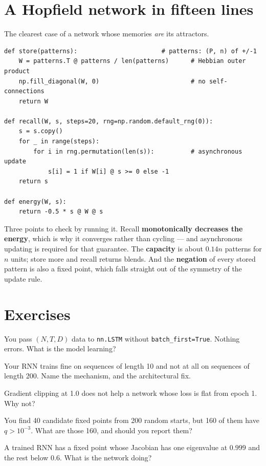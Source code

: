 \documentclass[11pt]{article}
\begin{document}
\section{A Hopfield network in fifteen lines}

The clearest case of a network whose memories \emph{are} its attractors.

\begin{lstlisting}
def store(patterns):                       # patterns: (P, n) of +/-1
    W = patterns.T @ patterns / len(patterns)      # Hebbian outer product
    np.fill_diagonal(W, 0)                         # no self-connections
    return W

def recall(W, s, steps=20, rng=np.random.default_rng(0)):
    s = s.copy()
    for _ in range(steps):
        for i in rng.permutation(len(s)):          # asynchronous update
            s[i] = 1 if W[i] @ s >= 0 else -1
    return s

def energy(W, s):
    return -0.5 * s @ W @ s
\end{lstlisting}

Three points to check by running it. Recall \textbf{monotonically decreases the
energy}, which is why it converges rather than cycling --- and asynchronous
updating is required for that guarantee. The \textbf{capacity} is about
$0.14n$ patterns for $n$ units; store more and recall returns blends. And the
\textbf{negation} of every stored pattern is also a fixed point, which falls
straight out of the symmetry of the update rule.

\section{Exercises}

 You pass $(N, T, D)$ data to \texttt{nn.LSTM} without
\texttt{batch\_first=True}. Nothing errors. What is the model learning?

 Your RNN trains fine on sequences of length 10 and not at all on
sequences of length 200. Name the mechanism, and the architectural fix.

 Gradient clipping at 1.0 does not help a network whose loss is flat
from epoch 1. Why not?

 You find 40 candidate fixed points from 200 random starts, but 160 of
them have $q > 10^{-3}$. What are those 160, and should you report them?

 A trained RNN has a fixed point whose Jacobian has one eigenvalue at
$0.999$ and the rest below $0.6$. What is the network doing?
\end{document}
